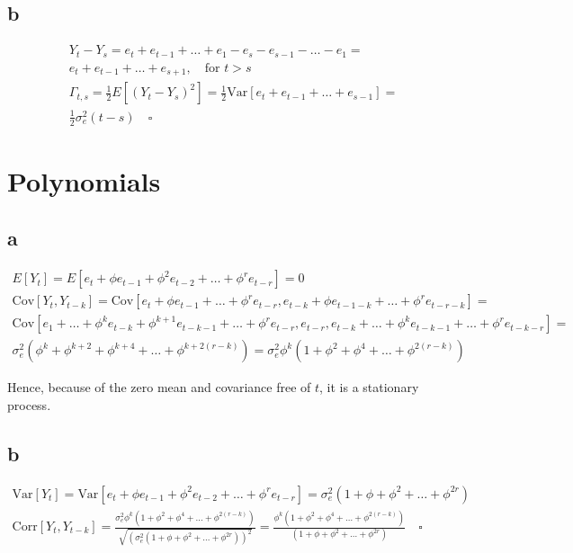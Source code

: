 \documentclass[]{book}
\begin{document}
\subsection*{b}\label{b-17}

\begin{gather*}
  Y_t-Y_s = e_t + e_{t-1} + \dots + e_1 - e_s - e_{s-1} - \dots - e_1 = \\
  e_t + e_{t-1} + \dots + e_{s+1}, \quad \text{for } t > s \\
  \Gamma_{t,s} = \frac{1}{2}E[(Y_t-Y_s)^2] = \frac{1}{2}\text{Var}[e_t + e_{t-1} + \dots + e_{s-1}] =\\ \frac{1}{2}\sigma_e^2(t-s) \quad \square
\end{gather*}

\section{Polynomials}\label{polynomials}

\subsection*{a}\label{a-18}

\begin{gather*}
  E[Y_t] = E[e_t + \phi e_{t-1} + \phi^2 e_{t-2} + \dots + \phi^r e_{t-r}] = 0\\
  \text{Cov}[Y_t, Y_{t-k}] = \text{Cov}[e_t + \phi e_{t-1} + \dots +
    \phi^r e_{t-r}, e_{t-k} + \phi e_{t-1-k} + \dots + \phi^r e_{t-r-k}] =\\
  \text{Cov}[e_1+\dots + \phi^k e_{t-k} + \phi^{k+1}e_{t-k-1} +
    \dots + \phi^r e_{t-r}, e_{t-r}, e_{t-k} + \dots + \phi^k e_{t-k-1} + \dots + \phi^r e_{t-k-r}] = \\
  \sigma_e^2(\phi^k + \phi^{k+2} + \phi^{k+4} + \dots + \phi^{k+2(r-k)}) = \sigma_e^2 \phi^k(1 + \phi^2 + \phi^4 + \dots + \phi^{2(r-k)})
\end{gather*}

Hence, because of the zero mean and covariance free of \(t\), it is a
stationary process.

\subsection*{b}\label{b-18}

\begin{gather*}
  \text{Var}[Y_t] = \text{Var}[e_t + \phi e_{t-1} + \phi^2 e_{t-2} + \dots + \phi^r e_{t-r}] = \sigma_e^2(1 + \phi + \phi^2 + \dots + \phi^{2r})\\
  \text{Corr}[Y_t, Y_{t-k}] = \frac{\sigma_e^2 \phi^k(1 + \phi^2 + \phi^4 + \dots + \phi^{2(r-k)})}{\sqrt{(\sigma_e^2(1 + \phi + \phi^2 + \dots + \phi^{2r}))^2}} = \frac{\phi^k(1 + \phi^2 + \phi^4 + \dots + \phi^{2(r-k)})}{(1 + \phi + \phi^2 + \dots + \phi^{2r})} \quad \square
\end{gather*}
\end{document}
